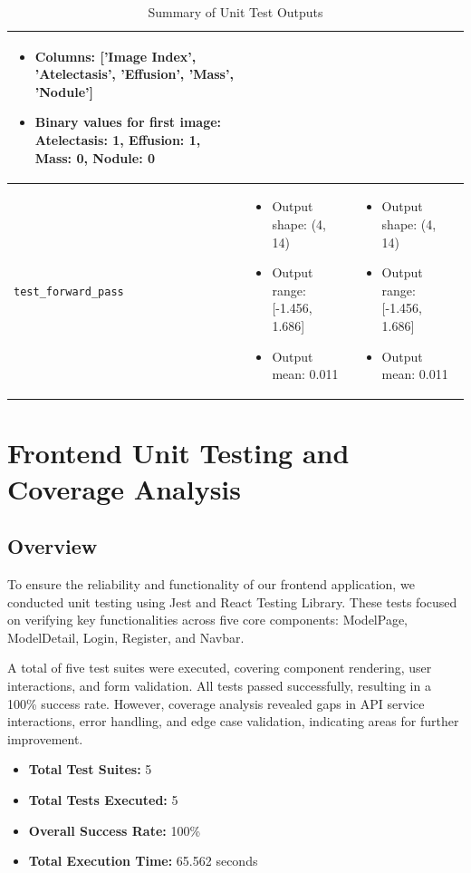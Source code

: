 \documentclass[12pt, titlepage]{article}
\begin{document}
\begin{table}[h!]
\begin{scriptsize}
\begin{tabular}{|p{4cm}|p{6cm}|p{6cm}|}
\begin{itemize}
    \item Columns: ['Image Index', 'Atelectasis', 'Effusion', 'Mass', 'Nodule']
    \item Binary values for first image: Atelectasis: 1, Effusion: 1, Mass: 0, Nodule: 0
\end{itemize} \\
\hline
\texttt{test\_forward\_pass} & 
\begin{itemize}
    \item Output shape: (4, 14)
    \item Output range: [-1.456, 1.686]
    \item Output mean: 0.011
\end{itemize} & 
\begin{itemize}
    \item Output shape: (4, 14)
    \item Output range: [-1.456, 1.686]
    \item Output mean: 0.011
\end{itemize} \\
\hline
\end{tabular}
\caption{Summary of Unit Test Outputs}
\label{tab:unit-test-outputs}
\end{scriptsize}
\end{table}


\section{Frontend Unit Testing and Coverage Analysis}

\subsection{Overview}

To ensure the reliability and functionality of our frontend application, we conducted unit testing using Jest and React Testing Library. These tests focused on verifying key functionalities across five core components: ModelPage, ModelDetail, Login, Register, and Navbar.

A total of five test suites were executed, covering component rendering, user interactions, and form validation. All tests passed successfully, resulting in a 100\% success rate. However, coverage analysis revealed gaps in API service interactions, error handling, and edge case validation, indicating areas for further improvement.

\begin{itemize}
    \item \textbf{Total Test Suites:} 5
    \item \textbf{Total Tests Executed:} 5
    \item \textbf{Overall Success Rate:} 100\%
    \item \textbf{Total Execution Time:} 65.562 seconds
\end{itemize}
\end{document}
